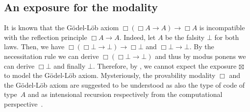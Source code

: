 \documentclass[a4paper,UKenglish,numberwithinsect,cleveref,thm-restate,draft]{lipics-v2021}
\numberwithin{equation}{section}
\theoremstyle{definition}
\theoremstyle{plain}
\begin{document}
%

\subsection{An exposure for the \texorpdfstring{\GL}{GL} modality}
It is known that the Gödel-Löb axiom $\Box(\Box A \to A) \to \Box A$ is incompatible with the reflection principle $\Box A \to A$.
Indeed, let $A$ be the falsity $\bot$ for both laws. Then, we have $\Box(\Box \bot \to \bot) \to \Box \bot$ and $\Box \bot \to \bot$.
By the necessitation rule we can derive $\Box (\Box \bot \to \bot)$ and thus by modus ponens we can derive $\Box \bot$ and finally $\bot$.
Therefore, by , we cannot expect the exposure $\boxtimes$ to model the Gödel-Löb axiom.
Mysteriously, the provability modality $\Box$ and the Gödel-Löb axiom are suggested to be understood as also the type of code of type~$A$ and as intensional recursion respectively from the computational perspective~\cite{Kavvos2017b}.%
\end{document}
